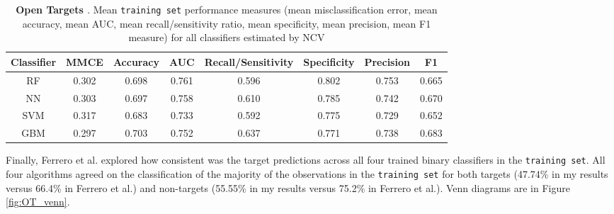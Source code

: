 \begin{table}[H]
\centering
\begin{tabular}{c|c|c|c|c|c|c|c}
Classifier & MMCE  & Accuracy   & AUC   & Recall/Sensitivity   & Specificity   & Precision   & F1    \\
\hline
RF         & 0.302 & 0.698 & 0.761 & 0.596 & 0.802 & 0.753 & 0.665 \\
NN         & 0.303 & 0.697 & 0.758 & 0.610 & 0.785 & 0.742 & 0.670 \\
SVM        & 0.317 & 0.683 & 0.733 & 0.592 & 0.775 & 0.729 & 0.652 \\
GBM        & 0.297 & 0.703 & 0.752 & 0.637 & 0.771 & 0.738 & 0.683
\end{tabular}
\caption{\textbf{Open Targets \cite{ferrero2017}}. Mean \texttt{training set} performance measures (mean misclassification error, mean accuracy, mean AUC, mean recall/sensitivity ratio, mean specificity, mean precision, mean F1 measure) for all classifiers estimated by NCV \label{tab:OT_perf_train_mean}}
\end{table}

Finally, Ferrero et al. explored how consistent was the target predictions across all four trained binary classifiers in the \texttt{training set}. All four algorithms agreed on the classification of the majority of the observations in the \texttt{training set} for both targets (47.74\% in my results versus 66.4\% in Ferrero et al.) and non-targets (55.55\% in my results versus 75.2\% in Ferrero et al.). Venn diagrams are in Figure \ref{fig:OT_venn}.

